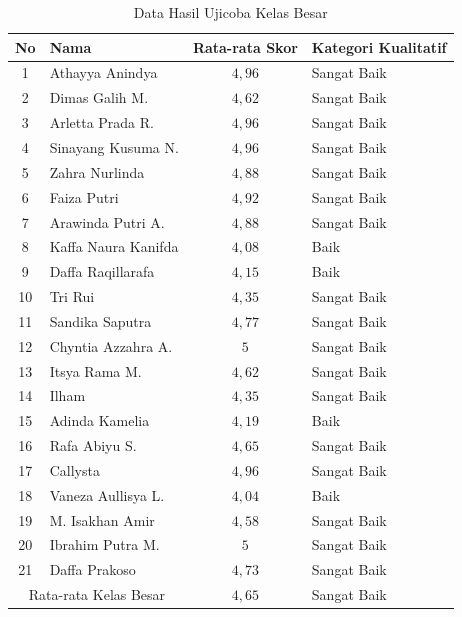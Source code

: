 \begin{enumerate}
\begin{table}[H]
        \centering
        \caption{Data Hasil Ujicoba Kelas Besar}
        \label{ujikelasbesar}
        \begin{tabular}{|c|l|c|l|}
            \hline
            \textbf{No} & \textbf{Nama} & \textbf{Rata-rata Skor} & \textbf{Kategori Kualitatif} \\
            \hline
            1 & Athayya Anindya & \(4{,}96\) & Sangat Baik \\
            2 & Dimas Galih M. & \(4{,}62\) & Sangat Baik \\
            3 & Arletta Prada R. & \(4{,}96\) & Sangat Baik \\
            4 & Sinayang Kusuma N. & \(4{,}96\) & Sangat Baik \\
            5 & Zahra Nurlinda & \(4{,}88\) & Sangat Baik \\
            6 & Faiza Putri & \(4{,}92\) & Sangat Baik \\
            7 & Arawinda Putri A. & \(4{,}88\) & Sangat Baik \\
            8 & Kaffa Naura Kanifda & \(4{,}08\) & Baik \\
            9 & Daffa Raqillarafa & \(4{,}15\) & Baik \\
            10 & Tri Rui & \(4{,}35\) & Sangat Baik \\
            11 & Sandika Saputra & \(4{,}77\) & Sangat Baik \\
            12 & Chyntia Azzahra A. & \(5\) & Sangat Baik \\
            13 & Itsya Rama M. & \(4{,}62\) & Sangat Baik \\
            14 & Ilham & \(4{,}35\) & Sangat Baik \\
            15 & Adinda Kamelia & \(4{,}19\) & Baik \\
            16 & Rafa Abiyu S. & \(4{,}65\) & Sangat Baik \\
            17 & Callysta & \(4{,}96\) & Sangat Baik \\
            18 & Vaneza Aullisya L. & \(4{,}04\) & Baik \\
            19 & M. Isakhan Amir & \(4{,}58\) & Sangat Baik \\
            20 & Ibrahim Putra M. & \(5\) & Sangat Baik \\
            21 & Daffa Prakoso & \(4{,}73\) & Sangat Baik \\
            \hline
            \multicolumn{2}{|c|}{Rata-rata Kelas Besar} & \(4{,}65\) & Sangat Baik \\
            \hline

\end{tabular}
\end{table}
\end{enumerate}
